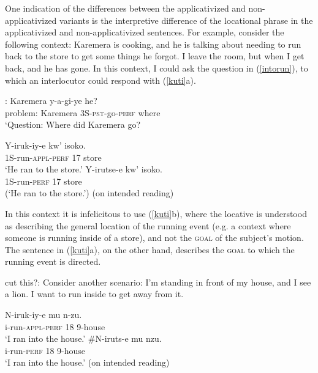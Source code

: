 \documentclass[output=paper]{langsci/langscibook}
\begin{document}
 
 One indication of the differences between the applicativized and non-applicativized variants is the interpretive difference of the locational phrase in the applicativized and non-applicativized sentences. For example, consider the following context: Karemera is cooking, and he is talking about needing to run back to the store to get some things he forgot. I leave the room, but when I get back, and he has gone. In this context, I could ask the question in (\ref{intorun}), to which an interlocutor could respond with (\ref{kuti}a).
	\begin{exe}
		\ex\label{intorun}\gll [Ikibazo]: Karemera y-a-gi-ye he?\\
				problem: Karemera 3S-{\scshape pst}-go-{\scshape perf} where\\
				\glt `Question: Where did Karemera go? 		
		\ex\label{kuti}\begin{xlist}
			\ex\gll Y-iruk-iy-e kw' isoko.\\
					{\scshape 1S-}run-{\scshape appl-perf} 17 store\\
					\glt `He ran to the store.' \hfill 
			\ex\gll\odd Y-irutse-e kw' isoko.\\
					{\scshape 1S-}run-{\scshape perf} 17 store\\
					\glt (`He ran to the store.') (on intended reading)
			\end{xlist}
	\end{exe}
%
In this context it is infelicitous to use (\ref{kuti}b), where the locative is understood as describing the general location of the running event (e.g. a context where someone is running inside of a store), and not the {\scshape goal}  of the subject's motion. The sentence in (\ref{kuti}a), on the other hand, describes the {\scshape goal}  to which the running event is directed. 

\iffalse
cut this?: Consider another scenario: I'm standing in front of my house, and I see a lion. I want to run inside to get away from it. 

	\begin{exe}
		\ex\label{intorun}\begin{xlist}
			\ex\gll N-iruk-iy-e mu n-zu.\\
					i-run-{\scshape appl-perf} 18 9-house\\
					\glt `I ran into the house.'
			\ex\gll \#N-iruts-e mu nzu.\\
					i-run-{\scshape perf} 18 9-house\\
					\glt `I ran into the house.'	(on intended reading)				
		\end{xlist}
	\end{exe}
%
\end{document}
